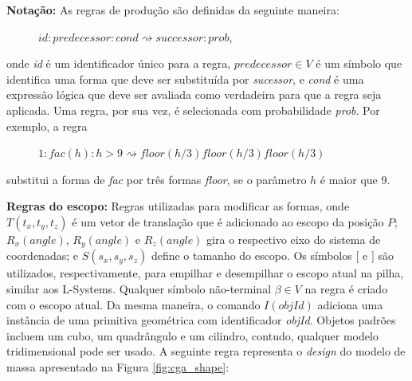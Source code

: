\textbf{Notação:} As regras de produção são definidas da seguinte maneira:

\vspace{0.5cm}

\begin{description}
    \item[] \qquad \qquad $id: predecessor : cond \rightsquigarrow successor : prob$,
\end{description}

\vspace{0.5cm}

\noindent onde \textit{id} é um identificador único para a regra, $predecessor \in V$ é um símbolo que identifica uma forma que deve ser substituída por \textit{sucessor}, e \textit{cond} é uma expressão lógica que deve ser avaliada como verdadeira para que a regra seja aplicada. Uma regra, por sua vez, é selecionada com probabilidade \textit{prob}. Por exemplo, a regra

\vspace{0.5cm}

\begin{description}
    \item[] \qquad \qquad  $1: fac(h): h > 9 \rightsquigarrow floor(h/3) floor(h/3) floor(h/3)$
\end{description}

\vspace{0.5cm}

\noindent substitui a forma de \textit{fac} por três formas \textit{floor}, se o parâmetro $h$ é maior que 9.

\textbf{Regras do escopo:} Regras utilizadas para modificar as formas, onde $T(t_x, t_y, t_z)$ é um vetor de translação que é adicionado ao escopo da posição $P$; $R_x(angle)$, $R_y(angle)$ e $R_z(angle)$ gira o respectivo eixo do sistema de coordenadas; e $S(s_x, s_y, s_z)$ define o tamanho do escopo. Os símbolos $[$ e $]$ são utilizados, respectivamente, para empilhar e desempilhar o escopo atual na pilha, similar aos \gls{L-Systems}. Qualquer símbolo não-terminal $ \beta \in V$ na regra é criado com o escopo atual. Da mesma maneira, o comando $I(objId)$ adiciona uma instância de uma primitiva geométrica com identificador \textit{objId}. Objetos padrões incluem um cubo, um quadrângulo e um cilindro, contudo, qualquer modelo tridimensional pode ser usado. A seguinte regra representa o \textit{design} do modelo de massa apresentado na Figura \ref{fig:cga_shape}:

\vspace{0.5cm}

